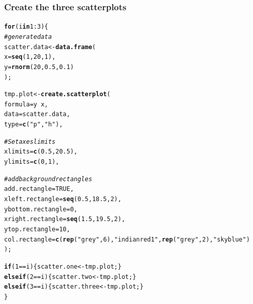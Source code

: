 \documentclass[letterpaper]{report}\usepackage[]{graphicx}\usepackage[]{color}
\makeatletter
\newcommand{\hlnum}[1]{\textcolor[rgb]{0.686,0.059,0.569}{#1}}%
\newcommand{\hlstr}[1]{\textcolor[rgb]{0.192,0.494,0.8}{#1}}%
\newcommand{\hlcom}[1]{\textcolor[rgb]{0.678,0.584,0.686}{\textit{#1}}}%
\newcommand{\hlopt}[1]{\textcolor[rgb]{0,0,0}{#1}}%
\newcommand{\hlstd}[1]{\textcolor[rgb]{0.345,0.345,0.345}{#1}}%
\newcommand{\hlkwa}[1]{\textcolor[rgb]{0.161,0.373,0.58}{\textbf{#1}}}%
\newcommand{\hlkwb}[1]{\textcolor[rgb]{0.69,0.353,0.396}{#1}}%
\newcommand{\hlkwc}[1]{\textcolor[rgb]{0.333,0.667,0.333}{#1}}%
\newcommand{\hlkwd}[1]{\textcolor[rgb]{0.737,0.353,0.396}{\textbf{#1}}}%
\newenvironment{kframe}{%
 \def\at@end@of@kframe{}%
 \ifinner\ifhmode%
  \def\at@end@of@kframe{\end{minipage}}%
  \begin{minipage}{\columnwidth}%
 \fi\fi%
 \def\FrameCommand##1{\hskip\@totalleftmargin \hskip-\fboxsep
 \colorbox{shadecolor}{##1}\hskip-\fboxsep
     \hskip-\linewidth \hskip-\@totalleftmargin \hskip\columnwidth}%
 \MakeFramed {\advance\hsize-\width
   \@totalleftmargin\z@ \linewidth\hsize
   \@setminipage}}%
 {\par\unskip\endMakeFramed%
 \at@end@of@kframe}
\newenvironment{knitrout}{}{} %
\makeatother
\begin{document}
\subsubsection{Create the three scatterplots}
\begin{knitrout}
\color{fgcolor}\begin{kframe}
\begin{alltt}
\hlkwa{for}\hlstd{(i} \hlkwa{in} \hlnum{1}\hlopt{:}\hlnum{3}\hlstd{)\{}
   \hlcom{# generate data}
        \hlstd{scatter.data} \hlkwb{<-} \hlkwd{data.frame}\hlstd{(}
                \hlkwc{x} \hlstd{=} \hlkwd{seq}\hlstd{(}\hlnum{1}\hlstd{,} \hlnum{20}\hlstd{,} \hlnum{1}\hlstd{),}
                \hlkwc{y} \hlstd{=} \hlkwd{rnorm}\hlstd{(}\hlnum{20}\hlstd{,} \hlnum{0.5}\hlstd{,} \hlnum{0.1}\hlstd{)}
                \hlstd{);}

        \hlstd{tmp.plot} \hlkwb{<-} \hlkwd{create.scatterplot}\hlstd{(}
                \hlkwc{formula} \hlstd{= y} \hlopt{~} \hlstd{x,}
                \hlkwc{data} \hlstd{= scatter.data,}
                \hlkwc{type} \hlstd{=} \hlkwd{c}\hlstd{(}\hlstr{"p"}\hlstd{,} \hlstr{"h"}\hlstd{),}

                \hlcom{# Set axes limits}
                \hlkwc{xlimits} \hlstd{=} \hlkwd{c}\hlstd{(}\hlnum{0.5}\hlstd{,} \hlnum{20.5}\hlstd{),}
                \hlkwc{ylimits} \hlstd{=} \hlkwd{c}\hlstd{(}\hlnum{0}\hlstd{,}\hlnum{1}\hlstd{),}

                \hlcom{# add background rectangles}
                \hlkwc{add.rectangle} \hlstd{=} \hlnum{TRUE}\hlstd{,}
                \hlkwc{xleft.rectangle} \hlstd{=} \hlkwd{seq}\hlstd{(}\hlnum{0.5}\hlstd{,} \hlnum{18.5}\hlstd{,} \hlnum{2}\hlstd{),}
                \hlkwc{ybottom.rectangle} \hlstd{=} \hlnum{0}\hlstd{,}
                \hlkwc{xright.rectangle} \hlstd{=} \hlkwd{seq}\hlstd{(}\hlnum{1.5}\hlstd{,} \hlnum{19.5}\hlstd{,} \hlnum{2}\hlstd{),}
                \hlkwc{ytop.rectangle} \hlstd{=} \hlnum{10}\hlstd{,}
                \hlkwc{col.rectangle} \hlstd{=} \hlkwd{c}\hlstd{(}\hlkwd{rep}\hlstd{(}\hlstr{"grey"}\hlstd{,} \hlnum{6}\hlstd{),} \hlstr{"indianred1"}\hlstd{,} \hlkwd{rep}\hlstd{(}\hlstr{"grey"}\hlstd{,} \hlnum{2}\hlstd{),} \hlstr{"skyblue"}\hlstd{)}
                \hlstd{);}

        \hlkwa{if} \hlstd{(}\hlnum{1} \hlopt{==} \hlstd{i) \{ scatter.one} \hlkwb{<-} \hlstd{tmp.plot; \}}
        \hlkwa{else if} \hlstd{(}\hlnum{2} \hlopt{==} \hlstd{i) \{ scatter.two} \hlkwb{<-} \hlstd{tmp.plot; \}}
        \hlkwa{else if} \hlstd{(}\hlnum{3} \hlopt{==} \hlstd{i) \{ scatter.three} \hlkwb{<-} \hlstd{tmp.plot; \}}
\hlstd{\}}


\end{alltt}
\end{kframe}
\end{knitrout}
\end{document}
